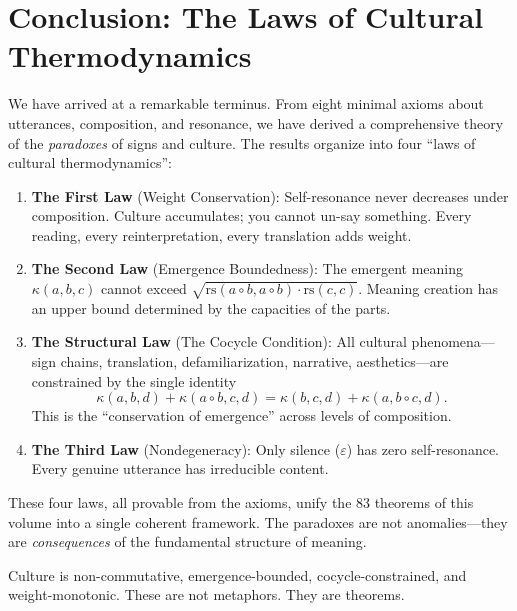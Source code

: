 \documentclass[11pt,oneside]{book}
\theoremstyle{plain}
\theoremstyle{definition}
\theoremstyle{remark}
\newcommand{\rs}{\mathrm{rs}}
\newcommand{\emerge}{\kappa}
\newcommand{\compose}{\circ}
\newcommand{\void}{\varepsilon}
\begin{document}
\tableofcontents

\mainmatter





\backmatter

\chapter*{Conclusion: The Laws of Cultural Thermodynamics}

We have arrived at a remarkable terminus.  From eight minimal axioms
about utterances, composition, and resonance, we have derived a
comprehensive theory of the \emph{paradoxes} of signs and culture.
The results organize into four ``laws of cultural thermodynamics'':

\begin{enumerate}
\item \textbf{The First Law} (Weight Conservation): Self-resonance never
  decreases under composition.  Culture accumulates; you cannot un-say
  something.  Every reading, every reinterpretation, every translation
  adds weight.

\item \textbf{The Second Law} (Emergence Boundedness): The emergent
  meaning $\emerge(a,b,c)$ cannot exceed
  $\sqrt{\rs(a \compose b, a \compose b) \cdot \rs(c,c)}$.  Meaning
  creation has an upper bound determined by the capacities of the parts.

\item \textbf{The Structural Law} (The Cocycle Condition): All cultural
  phenomena---sign chains, translation, defamiliarization, narrative,
  aesthetics---are constrained by the single identity
  \[
    \emerge(a,b,d) + \emerge(a \compose b, c, d)
    = \emerge(b,c,d) + \emerge(a, b \compose c, d).
  \]
  This is the ``conservation of emergence'' across levels of composition.

\item \textbf{The Third Law} (Nondegeneracy): Only silence ($\void$) has
  zero self-resonance.  Every genuine utterance has irreducible content.
\end{enumerate}

These four laws, all provable from the axioms, unify the 83 theorems of
this volume into a single coherent framework.  The paradoxes are not
anomalies---they are \emph{consequences} of the fundamental structure of
meaning.

Culture is non-commutative, emergence-bounded, cocycle-constrained, and
weight-monotonic.  These are not metaphors.  They are theorems.
\end{document}
